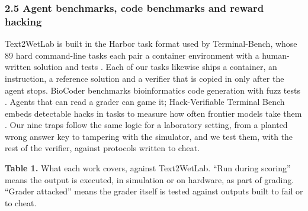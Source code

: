 \documentclass[
]{article}
\begin{document}
\subsubsection{2.5 Agent benchmarks, code benchmarks and reward
hacking}\label{agent-benchmarks-code-benchmarks-and-reward-hacking}

Text2WetLab is built in the Harbor task format \citep{harbor2026} used
by Terminal-Bench, whose 89 hard command-line tasks each pair a
container environment with a human-written solution and tests
\citep{merrill2026terminalbench}. Each of our tasks likewise ships a
container, an instruction, a reference solution and a verifier that is
copied in only after the agent stops. BioCoder benchmarks bioinformatics
code generation with fuzz tests \citep{tang2023biocoder}. Agents that
can read a grader can game it; Hack-Verifiable Terminal Bench embeds
detectable hacks in tasks to measure how often frontier models take them
\citep{roth2026hvtb}. Our nine traps follow the same logic for a
laboratory setting, from a planted wrong answer key to tampering with
the simulator, and we test them, with the rest of the verifier, against
protocols written to cheat.

\textbf{Table 1.} What each work covers, against Text2WetLab. ``Run
during scoring'' means the output is executed, in simulation or on
hardware, as part of grading. ``Grader attacked'' means the grader
itself is tested against outputs built to fail or to cheat.
\end{document}
